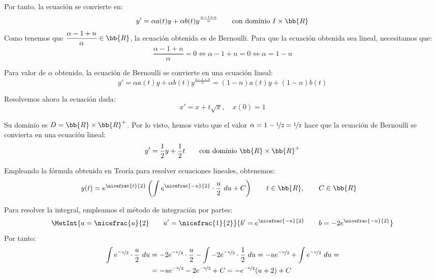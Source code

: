 \begin{ejercicio}
    Por tanto, la ecuación se convierte en:
    \begin{equation*}
        y' = \alpha a(t) y+ \alpha b(t)y^{\frac{\alpha-1+n}{\alpha}}\qquad \text{con dominio }I\times \bb{R}
    \end{equation*}
    Como tenemos que $\dfrac{\alpha-1+n}{\alpha}\in \bb{R}$, la ecuación obtenida es de Bernoulli.
    Para que la ecuación obtenida sea lineal, necesitamos que:
    \begin{equation*}
        \dfrac{\alpha-1+n}{\alpha} = 0 \Longleftrightarrow \alpha-1+n = 0 \Longleftrightarrow \alpha = 1-n
    \end{equation*}

    Para valor de $\alpha$ obtenido, la ecuación de Bernoulli se convierte en una ecuación lineal:
    \begin{equation*}
        y' = \alpha a(t) y+ \alpha b(t)y^{\frac{\alpha-1+n}{\alpha}} = (1-n)a(t)y + (1-n)b(t)
    \end{equation*}

    Resolvemos ahora la ecuación dada:
    \begin{equation*}
        x' = x + t\sqrt{x}, \quad x(0) = 1
    \end{equation*}

    Su dominio es $D=\bb{R}\times \bb{R}^+$.
    Por lo visto, hemos visto que el valor $\alpha=1-\nicefrac{1}{2}=\nicefrac{1}{2}$ hace que la ecuación de Bernoulli se convierta en una ecuación lineal:
    \begin{equation*}
        y' = \dfrac{1}{2}y  + \dfrac{1}{2}t \qquad \text{con dominio }\bb{R}\times \bb{R}^+
    \end{equation*}

    Empleando la fórmula obtenida en Teoría para resolver ecuaciones lineales, obtenemos:
    \begin{align*}
        y(t) &= e^{\nicefrac{t}{2}}\left(\int e^{\nicefrac{-u}{2}}\cdot \frac{u}{2}~du + C\right) \qquad t\in \bb{R}, \qquad C\in \bb{R}
    \end{align*}

    Para resolver la integral, empleamos el método de integración por partes:
    \begin{equation*}
        \MetInt{a=\nicefrac{u}{2}\qquad a'=\nicefrac{1}{2}}{b'=e^{\nicefrac{-u}{2}}\qquad b=-2e^{\nicefrac{-u}{2}}}
    \end{equation*}
    Por tanto:
    \begin{align*}
        \int e^{\nicefrac{-u}{2}}\cdot \frac{u}{2}~du &= -2e^{\nicefrac{-u}{2}}\cdot \frac{u}{2} - \int -2e^{\nicefrac{-u}{2}}\cdot \frac{1}{2}~du = -ue^{\nicefrac{-u}{2}} + \int e^{\nicefrac{-u}{2}}~du =\\&= -ue^{\nicefrac{-u}{2}} - 2e^{\nicefrac{-u}{2}} + C
        = -e^{\nicefrac{-u}{2}}(u+2) + C
    \end{align*}


\end{ejercicio}
